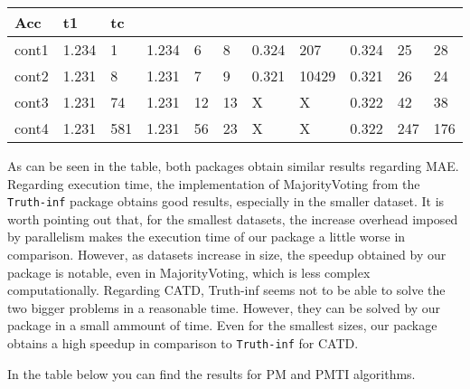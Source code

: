 \documentclass[letterpaper,10pt,english]{sphinxmanual}
\begin{document}
\begin{savenotes}
\begin{tabulary}{\linewidth}[t]{|T|T|T|T|T|T|T|T|T|T|T|}
Acc
&\sphinxstyletheadfamily 
t1
&\sphinxstyletheadfamily 
tc
\\
\hline
cont1
&
1.234
&
1
&
1.234
&
6
&
8
&
0.324
&
207
&
0.324
&
25
&
28
\\
\hline
cont2
&
1.231
&
8
&
1.231
&
7
&
9
&
0.321
&
10429
&
0.321
&
26
&
24
\\
\hline
cont3
&
1.231
&
74
&
1.231
&
12
&
13
&
X
&
X
&
0.322
&
42
&
38
\\
\hline
cont4
&
1.231
&
581
&
1.231
&
56
&
23
&
X
&
X
&
0.322
&
247
&
176
\\
\hline
\end{tabulary}
\par
\sphinxattableend\end{savenotes}

As can be seen in the table, both packages obtain similar results regarding MAE. Regarding execution time,
the implementation of MajorityVoting from the \texttt{Truth-inf} package obtains good results, especially in the smaller dataset. 
It is worth pointing out that, for the smallest datasets, the increase overhead imposed by parallelism makes the execution time of 
our package a little worse in comparison.
However, as datasets increase in size, the speedup obtained by our package is notable, even in MajorityVoting,
which is less complex computationally. Regarding CATD, Truth-inf seems not to be able to solve the two bigger problems
in a reasonable time. However, they can be solved by our package in a small ammount of time. Even for the smallest sizes, 
our package obtains a high speedup in comparison to \texttt{Truth-inf} for CATD.

In the table below you can find the results for PM and PMTI algorithms.
\end{document}
